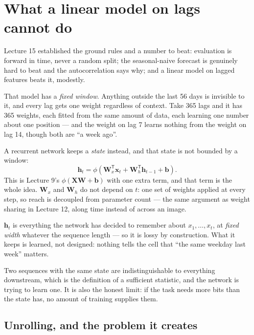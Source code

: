 \documentclass[11pt,a4paper]{article}
\begin{document}

\section{What a linear model on lags cannot do}

Lecture 15 established the ground rules and a number to beat: evaluation is
forward in time, never a random split; the seasonal-naive forecast is genuinely
hard to beat and the autocorrelation says why; and a linear model on lagged
features beats it, modestly.

That model has a \emph{fixed window}. Anything outside the last 56 days is
invisible to it, and every lag gets one weight regardless of context. Take 365
lags and it has 365 weights, each fitted from the same amount of data, each
learning one number about one position --- and the weight on lag 7 learns
nothing from the weight on lag 14, though both are ``a week ago''.

A recurrent network keeps a \emph{state} instead, and that state is not bounded
by a window:
\[ \mathbf{h}_t = \phi\!\left(\mathbf{W}_x^{\mathsf T}\mathbf{x}_t
   + \mathbf{W}_h^{\mathsf T}\mathbf{h}_{t-1} + \mathbf{b}\right). \]
This is Lecture 9's $\phi(\mathbf{X}\mathbf{W} + \mathbf{b})$ with one extra
term, and that term is the whole idea. $\mathbf{W}_x$ and $\mathbf{W}_h$ do not
depend on $t$: one set of weights applied at every step, so reach is decoupled
from parameter count --- the same argument as weight sharing in Lecture 12,
along time instead of across an image.

\begin{keybox}[title={The state is a summary, and that is a budget}]
$\mathbf{h}_t$ is everything the network has decided to remember about
$x_1,\dots,x_t$, at \emph{fixed width} whatever the sequence length --- so it
is lossy by construction. What it keeps is learned, not designed: nothing tells
the cell that ``the same weekday last week'' matters.

Two sequences with the same state are indistinguishable to everything
downstream, which is the definition of a sufficient statistic, and the network
is trying to learn one. It is also the honest limit: if the task needs more
bits than the state has, no amount of training supplies them.
\end{keybox}

\subsection{Unrolling, and the problem it creates}
\end{document}
